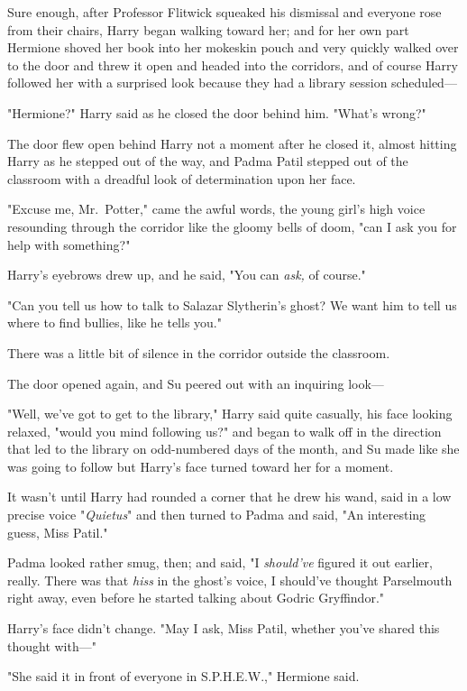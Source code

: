 Sure enough, after Professor Flitwick squeaked his dismissal and everyone rose
from their chairs, Harry began walking toward her; and for her own part
Hermione shoved her book into her mokeskin pouch and very quickly walked over
to the door and threw it open and headed into the corridors, and of course
Harry followed her with a surprised look because they had a library session
scheduled—

"Hermione?" Harry said as he closed the door behind him. "What's wrong?"

The door flew open behind Harry not a moment after he closed it, almost hitting
Harry as he stepped out of the way, and Padma Patil stepped out of the
classroom with a dreadful look of determination upon her face.

"Excuse me, Mr.~Potter," came the awful words, the young girl's high voice
resounding through the corridor like the gloomy bells of doom, "can I ask you
for help with something?"

Harry's eyebrows drew up, and he said, "You can \emph{ask,} of course."

"Can you tell us how to talk to Salazar Slytherin's ghost? We want him to tell
us where to find bullies, like he tells you."

There was a little bit of silence in the corridor outside the classroom.

The door opened again, and Su peered out with an inquiring look—

"Well, we've got to get to the library," Harry said quite casually, his face
looking relaxed, "would you mind following us?" and began to walk off in the
direction that led to the library on odd-numbered days of the month, and Su
made like she was going to follow but Harry's face turned toward her for a
moment.

It wasn't until Harry had rounded a corner that he drew his wand, said in a low
precise voice "\emph{Quietus}" and then turned to Padma and said, "An
interesting guess, Miss Patil."

Padma looked rather smug, then; and said, "I \emph{should've} figured it out
earlier, really. There was that \emph{hiss} in the ghost's voice, I should've
thought Parselmouth right away, even before he started talking about Godric
Gryffindor."

Harry's face didn't change. "May I ask, Miss Patil, whether you've shared this
thought with—"

"She said it in front of everyone in S.P.H.E.W.," Hermione said.

